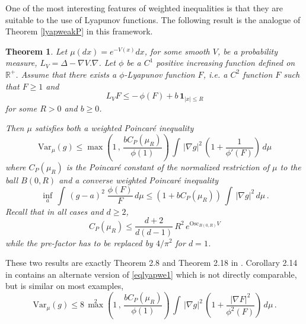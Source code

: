 \documentclass[11pt,reqno]{amsart}
\numberwithin{equation}{section}
\newtheorem{theorem}{Theorem}[section]
\theoremstyle{definition}
\theoremstyle{remark}
\def \Var {\textrm{Var}}
\def \Osc {\textrm{Osc}}
\begin{document}
One of the most interesting features of weighted inequalities is that they are suitable to the use of Lyapunov functions. The following result is the analogue of Theorem \ref{lyapweakP} in this framework.
\begin{theorem}\label{thmlyapweight}
Let $\mu(dx)=e^{-V(x)} dx$, for some smooth $V$, be a probability measure, $L_V=\Delta - \nabla V.\nabla$. Let $\phi$ be a $C^1$ positive increasing function defined on $\mathbb R^+$. Assume that there exists a $\phi$-Lyapunov function $F$, i.e. a $C^2$ function $F$ such that $F\geq 1$ and $$L_V F \leq - \, \phi(F) + b \, \mathbf 1_{|x|\leq R}$$ for some $R>0$ and $b \geq 0$.

Then $\mu$ satisfies both a weighted Poincar\'e inequality 
\begin{equation}\label{eqlyapwe1}
\Var_\mu(g) \leq \max \left(1 \, , \, \frac{bC_P(\mu_R)}{\phi(1)}\right) \, \int \, |\nabla g|^2 \, \left(1+ \frac{1}{\phi'(F)}\right) \, d\mu
\end{equation}
where $C_P(\mu_R)$ is the Poincar\'e constant of the normalized restriction of $\mu$ to the ball $B(0,R)$ and a converse weighted Poincar\'e inequality 
\begin{equation}\label{eqlyapwe2}
\inf_a \, \int \, (g-a)^2 \; \frac{\phi(F)}{F} \, d\mu \leq (1+bC_P(\mu_R)) \, \int \, |\nabla g|^2 \, d\mu \, .
\end{equation}
Recall that in all cases and $d\geq 2$,  $$C_P(\mu_R) \leq \frac{d+2}{d(d-1)} \, R^2 \, e^{\Osc_{B(0,R)} V}$$  while the pre-factor has to be replaced by $4/\pi^2$ for $d=1$.
\end{theorem}
These two results are exactly Theorem 2.8 and Theorem 2.18 in \cite{CGGR}. Corollary 2.14 in \cite{CGGR} contains an alternate version of \eqref{eqlyapwe1} which is not directly comparable, but is similar on most examples,
\begin{equation}\label{eqlyapwe3}
\Var_\mu(g) \leq 8 \, {\max}^2 \left(1 \, , \, \frac{bC_P(\mu_R)}{\phi(1)}\right) \, \int \, |\nabla g|^2 \, \left(1+ \frac{|\nabla F|^2}{\phi^2(F)}\right) \, d\mu \, .
\end{equation}
\end{document}
